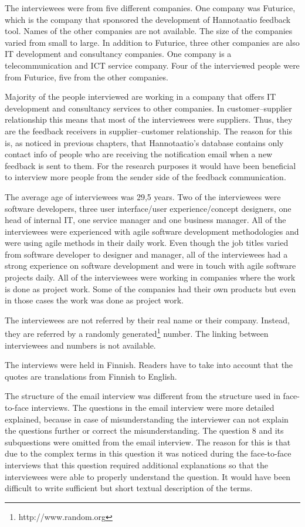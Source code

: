 \documentclass[english,12pt,a4paper,pdftex]{article}
\begin{document}
The interviewees were from five different companies. One company was Futurice, which is the company that sponsored the development of Hannotaatio feedback tool. Names of the other companies are not available. The size of the companies varied from small to large. In addition to Futurice, three other companies are also IT development and consultancy companies. One company is a telecommunication and ICT service company. Four of the interviewed people were from Futurice, five from the other companies.

Majority of the people interviewed are working in a company that offers IT development and consultancy services to other companies. In customer--supplier relationship this means that most of the interviewees were suppliers. Thus, they are the feedback receivers in supplier--customer relationship. The reason for this is, as noticed in previous chapters, that Hannotaatio's database contains only contact info of people who are receiving the notification email when a new feedback is sent to them. For the research purposes it would have been beneficial to interview more people from the sender side of the feedback communication.

The average age of interviewees was 29,5 years. Two of the interviewees were software developers, three user interface/user experience/concept designers, one head of internal IT, one service manager and one business manager. All of the interviewees were experienced with agile software development methodologies and were using agile methods in their daily work. Even though the job titles varied from software developer to designer and manager, all of the interviewees had a strong experience on software development and were in touch with agile software projects daily. All of the interviewees were working in companies where the work is done as project work. Some of the companies had their own products but even in those cases the work was done as project work.

The interviewees are not referred by their real name or their company. Instead, they are referred by a randomly generated\footnote{http://www.random.org} number. The linking between interviewees and numbers is not available.

The interviews were held in Finnish. Readers have to take into account that the quotes are translations from Finnish to English.


The structure of the email interview was different from the structure used in face-to-face interviews. The questions in the email interview were more detailed explained, because in case of misunderstanding the interviewer can not explain the questions further or correct the misunderstanding. The question 8 and its subquestions were omitted from the email interview. The reason for this is that due to the complex terms in this question it was noticed during the face-to-face interviews that this question required additional explanations so that the interviewees were able to properly understand the question. It would have been difficult to write sufficient but short textual description of the terms.
\end{document}
